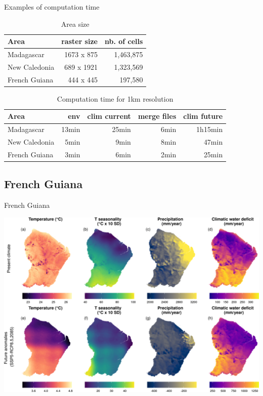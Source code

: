 \documentclass[10pt,table,dvipsnames,compress]{beamer}
\begin{document}
\begin{frame}[label={sec:org68f0818}]{Examples of computation time}
\begin{table}[htbp]
\caption{\label{tab:org7b13e96}Area size}
\centering
\small
\begin{tabular}{lrr}
\toprule
Area & raster size & nb. of cells\\[0pt]
\midrule
Madagascar & 1673 x 875 & 1,463,875\\[0pt]
New Caledonia & 689 x 1921 & 1,323,569\\[0pt]
French Guiana & 444 x 445 & 197,580\\[0pt]
\bottomrule
\end{tabular}
\end{table}

\begin{table}[htbp]
\caption{\label{tab:orgffa332a}Computation time for 1km resolution}
\centering
\small
\begin{tabular}{lrrrr}
\toprule
Area & env & clim current & merge files & clim future\\[0pt]
\midrule
Madagascar & 13min & 25min & 6min & 1h15min\\[0pt]
New Caledonia & 5min & 9min & 8min & 47min\\[0pt]
French Guiana & 3min & 6min & 2min & 25min\\[0pt]
\bottomrule
\end{tabular}
\end{table}
\end{frame}

\subsection{French Guiana}
\label{sec:org5817eea}

\begin{frame}[label={sec:org2398694}]{French Guiana}
\begin{center}
\includegraphics[width=.9\linewidth]{figs/gecevar-guyane.png}
\end{center}
\end{frame}
\end{document}
